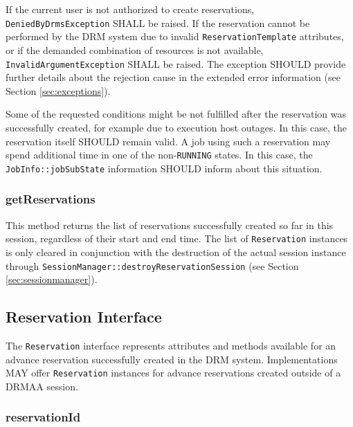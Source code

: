 \documentclass{article}
\newcommand{\h}[1]{\lstinline|#1|}
\newcommand{\rat}[1]{}
\begin{document}
If the current user is not authorized to create reservations, \h{DeniedByDrmsException}  SHALL be raised. If the reservation cannot be performed by the DRM system due to invalid \h{ReservationTemplate} attributes, or if the demanded combination of resources is not available, \h{InvalidArgumentException} SHALL be raised. The exception SHOULD provide further details about the rejection cause in the extended error information (see Section \ref{sec:exceptions}).

Some of the requested conditions might be not fulfilled after the reservation was successfully created, for example due to execution host outages. In this case, the reservation itself SHOULD remain valid. A job using such a reservation may spend additional time in one of the non-\h{RUNNING} states. In this case, the \h{JobInfo::jobSubState} information SHOULD inform about this situation.

\rat{In DRMAA 2.0 we do not have an explicit state model for advance reservations, as the reservation state can be easily deducted by comparing current time with reservation start and end time. For this reason, we use the subState approach for informing the user about the described situation. }

\subsubsection{getReservations}

This method returns the list of reservations successfully created so far in this session, regardless of their start and end time. The list of \h{Reservation} instances is only cleared in conjunction with the destruction of the actual session instance through \h{SessionManager::destroyReservationSession} (see Section \ref{sec:sessionmanager}).

\subsection{Reservation Interface}
\label{sec:reservation}

The \h{Reservation} interface represents attributes and methods available for an advance reservation successfully created in the DRM system.  Implementations MAY offer \h{Reservation} instances for advance reservations created outside of a DRMAA session.




\subsubsection{reservationId}
\label{sec:reservationid}
\end{document}
